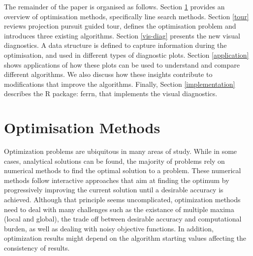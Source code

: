 \documentclass[12pt]{article}
\begin{document}
The remainder of the paper is organised as follows.
Section \ref{optim} provides an overview of optimisation methods, specifically line search methods.
Section \ref{tour} reviews projection pursuit guided tour, defines the optimisation problem and introduces three existing algorithms.
Section \ref{vis-diag} presents the new visual diagnostics. A data structure is defined to capture information during the optimisation, and used in different types of diagnostic plots.
Section \ref{application} shows applications of how these plots can be used to understand and compare different algorithms. We also discuss how these insights contribute to modifications that improve the algorithms.
Finally, Section \ref{implementation} describes the R package: ferrn, that implements the visual diagnostics.

\hypertarget{optim}{%
\section{Optimisation Methods}\label{optim}}

Optimization problems are ubiquitous in many areas of study. While in some cases, analytical solutions can be found, the majority of problems rely on numerical methods to find the optimal solution to a problem. These numerical methods follow interactive approaches that aim at finding the optimum by progressively improving the current solution until a desirable accuracy is achieved. Although that principle seems uncomplicated, optimization methods need to deal with many challenges such as the existance of multiple maxima (local and global), the trade off between desirable accuracy and computational burden, as well as dealing with noisy objective functions. In addition, optimization results might depend on the algorithm starting values affecting the consistency of results.
\end{document}
